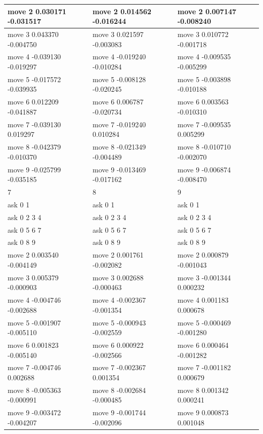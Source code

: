 \documentclass{ctexart}
\begin{document}
\begin{flushleft}
\begin{table}[H]
\begin{tabular}{|l|l|l|}
      move 2 0.030171 -0.031517 & move 2 0.014562 -0.016244 & move 2 0.007147 -0.008240 \\ \hline
      move 3 0.043370 -0.004750 & move 3 0.021597 -0.003083 & move 3 0.010772 -0.001718 \\ \hline
      move 4 -0.039130 -0.019297 & move 4 -0.019240 -0.010284 & move 4 -0.009535 -0.005299 \\ \hline
      move 5 -0.017572 -0.039935 & move 5 -0.008128 -0.020245 & move 5 -0.003898 -0.010188 \\ \hline
      move 6 0.012209 -0.041887 & move 6 0.006787 -0.020734 & move 6 0.003563 -0.010310 \\ \hline
      move 7 -0.039130 0.019297 & move 7 -0.019240 0.010284 & move 7 -0.009535 0.005299 \\ \hline
      move 8 -0.042379 -0.010370 & move 8 -0.021349 -0.004489 & move 8 -0.010710 -0.002070 \\ \hline
      move 9 -0.025799 -0.035185 & move 9 -0.013469 -0.017162 & move 9 -0.006874 -0.008470 \\ \hline
      7 & 8 & 9 \\ \hline
      ask 0 1 & ask 0 1 & ask 0 1 \\ \hline
      ask 0 2 3 4 & ask 0 2 3 4 & ask 0 2 3 4 \\ \hline
      ask 0 5 6 7 & ask 0 5 6 7 & ask 0 5 6 7 \\ \hline
      ask 0 8 9 & ask 0 8 9 & ask 0 8 9 \\ \hline
      move 2 0.003540 -0.004149 & move 2 0.001761 -0.002082 & move 2 0.000879 -0.001043 \\ \hline
      move 3 0.005379 -0.000903 & move 3 0.002688 -0.000463 & move 3 -0.001344 0.000232 \\ \hline
      move 4 -0.004746 -0.002688 & move 4 -0.002367 -0.001354 & move 4 0.001183 0.000678 \\ \hline
      move 5 -0.001907 -0.005110 & move 5 -0.000943 -0.002559 & move 5 -0.000469 -0.001280 \\ \hline
      move 6 0.001823 -0.005140 & move 6 0.000922 -0.002566 & move 6 0.000464 -0.001282 \\ \hline
      move 7 -0.004746 0.002688 & move 7 -0.002367 0.001354 & move 7 -0.001182 0.000679 \\ \hline
      move 8 -0.005363 -0.000991 & move 8 -0.002684 -0.000485 & move 8 0.001342 0.000241 \\ \hline
      move 9 -0.003472 -0.004207 & move 9 -0.001744 -0.002096 & move 9 0.000873 0.001048 \\ \hline

\end{tabular}
\end{table}
\end{flushleft}
\end{document}
